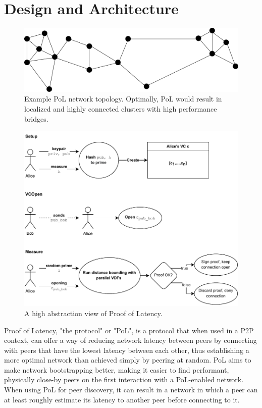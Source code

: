 \chapter{Design and Architecture}
\label{Proof of Latency}
\begin{figure}
	\includegraphics[width=\textwidth]{pictures/pol_topology.pdf}
	\caption{Example PoL network topology. Optimally, PoL would result in localized and highly connected clusters with high performance bridges.}
	\label{PoL Example Topology}
\end{figure}

\begin{figure}
	\includegraphics[width=\textwidth]{pictures/PoL_highest_abstraction.pdf}
	\caption{A high abstraction view of Proof of Latency.}
	\label{PoL Diagram 1}
\end{figure}

Proof of Latency, "the protocol" or "PoL", is a protocol that when used in a P2P context, can offer a way of reducing network latency between peers by connecting with peers that have the lowest latency between each other, thus establishing a more optimal network than achieved simply by peering at random. PoL aims to make network bootstrapping better, making it easier to find performant, physically close-by peers on the first interaction with a PoL-enabled network. When using PoL for peer discovery, it can result in a network in which a peer can at least roughly estimate its latency to another peer before connecting to it.

